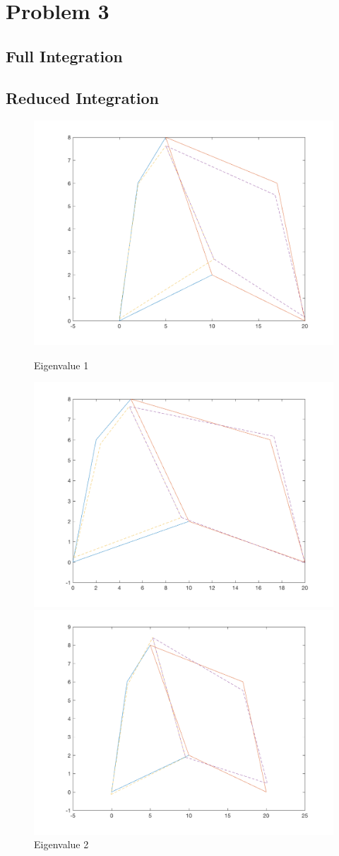 \documentclass[11pt]{amsart}
\begin{document}
\section{Problem 3}
\subsection{Full Integration}
\subsection{Reduced Integration}


\begin{figure}[H] 
  \label{fig1} 
  \begin{minipage}[b]{0.5\linewidth}
    \centering
    \includegraphics[width=.5\linewidth]{eigenvectors/eigenvector_1_fullint.png} 
    \caption{Eigenvalue 1} 
    \vspace{4ex}
  \end{minipage}%
  \begin{minipage}[b]{0.5\linewidth}
    \centering
    \includegraphics[width=.5\linewidth]{eigenvectors/eigenvector_2_fullint.png} 
    \caption{Eigenvalue 2} 
    \vspace{4ex}
  \end{minipage} 
  \begin{minipage}[b]{0.5\linewidth}
    \centering
    \includegraphics[width=.5\linewidth]{eigenvectors/eigenvector_3_fullint.png} 

\end{minipage}
\end{figure}
\end{document}
